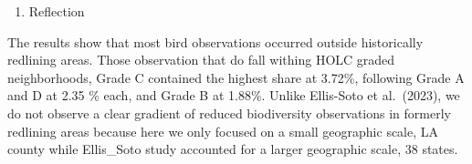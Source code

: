 \documentclass[
  letterpaper,
  DIV=11,
  numbers=noendperiod]{scrartcl}
\providecommand{\tightlist}{%
  \setlength{\itemsep}{0pt}\setlength{\parskip}{0pt}}\usepackage{longtable,booktabs,array}
\begin{document}
\begin{enumerate}
\def\labelenumi{\arabic{enumi}.}
\setcounter{enumi}{4}
\tightlist
\item
  Reflection
\end{enumerate}

The results show that most bird observations occurred outside
historically redlining areas. Those observation that do fall withing
HOLC graded neighborhoods, Grade C contained the highest share at
3.72\%, following Grade A and D at 2.35 \% each, and Grade B at 1.88\%.
Unlike Ellis-Soto et al.~(2023), we do not observe a clear gradient of
reduced biodiversity observations in formerly redlining areas because
here we only focused on a small geographic scale, LA county while
Ellis\_Soto study accounted for a larger geographic scale, 38 states.
\end{document}
